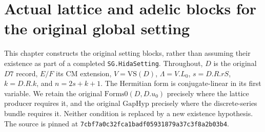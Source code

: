 \documentclass[11pt,a4paper]{article}
\numberwithin{equation}{section}
\theoremstyle{remark}\newtheorem{remark}[theorem]{Remark}
\begin{document}
\section{Actual lattice and adelic blocks for the original global setting}
\label{sec:adelic-setting-v47}

This chapter constructs the original setting blocks, rather than assuming
their existence as part of a completed \texttt{SG.\allowbreak Hida\allowbreak Setting}.
Throughout, \(D\) is the original \(D7\) record, \(E/F\) its CM
extension, \(V=\mathrm{VS}(D)\), \(\Lambda=V.L_0\),
\(s=D.R.rS\), \(k=D.R.k\), and \(n=2s+k+1\).
The Hermitian form is conjugate-linear in its first variable.
We retain the original \(\mathrm{Forms0}(D,D.u_0)\) precisely where
the lattice producer requires it, and the original \(\mathrm{GapHyp}\)
precisely where the discrete-series bundle requires it.
Neither condition is replaced by a new existence hypothesis.
The source is pinned at
\texttt{7cbf7a0c32fca1badf05931879a37c3f8a2b03b4}.

\end{document}
